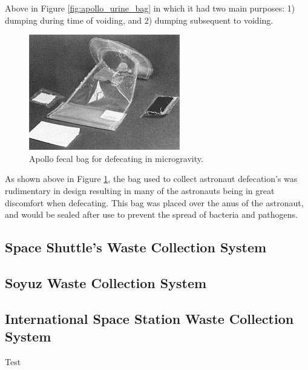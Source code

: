    Above in Figure \ref{fig:apollo_urine_bag} in which it had two main purposes: 1) dumping during time of voiding, and 2) dumping subsequent to voiding.

    \begin{figure}[h]
        \centering
        \includegraphics[width = 0.5\linewidth]{figs/apollo_fecal_bag.jpg}
        \caption[Apollo Fecal Bag]{Apollo fecal bag for defecating in microgravity.}
        \label{fig:apollo_fecal_bag}
    \end{figure}

    As shown above in Figure \ref{fig:apollo_fecal_bag}, the bag used to collect astronaut defecation's was rudimentary in design resulting in many of the astronauts being in great discomfort when defecating. This bag was placed over the anus of the astronaut, and would be sealed after use to prevent the spread of bacteria and pathogens.
    


    \pagebreak
    \subsection{Space Shuttle's Waste Collection System}

    \subsection{Soyuz Waste Collection System}

    \subsection{International Space Station Waste Collection System}

    Test \cite{iss_background}

 
    \pagebreak
    
    \printbibliography[type=article,title = {References}, heading=subbibintoc]
    {\vspace{-2cm}\vskip-\ht\strutbox\makebox[\textwidth][c]{\rule{\dimexpr\textwidth}{2pt}}\par}

    \thispagestyle{empty}


